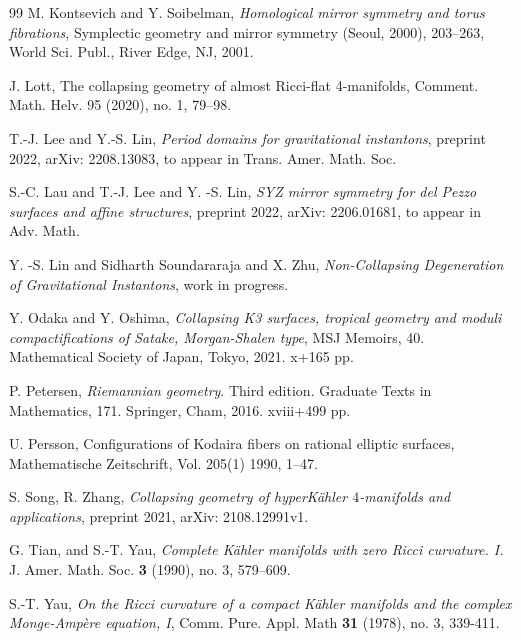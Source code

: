 \documentclass[11pt]{amsart}
\theoremstyle{plain}
\theoremstyle{definition}
\numberwithin{equation}{section}
\begin{document}
\begin{thebibliography}{99}
	 M. Kontsevich and Y. Soibelman, {\em Homological mirror symmetry and torus fibrations}, Symplectic geometry and mirror symmetry (Seoul, 2000), 203–263, World Sci. Publ., River Edge, NJ, 2001. 
	
	 J. Lott, The collapsing geometry of almost Ricci-flat 4-manifolds, Comment. Math. Helv. 95 (2020), no. 1, 79–98.
	
	 T.-J. Lee and Y.-S. Lin, {\em Period domains for gravitational instantons}, preprint 2022, arXiv: 2208.13083, to appear in Trans. Amer. Math. Soc.
	
	 S.-C. Lau and T.-J. Lee and Y. -S. Lin, {\em SYZ mirror symmetry for del Pezzo surfaces and affine structures}, preprint 2022, arXiv: 2206.01681, to appear in Adv. Math. 
	 
	
	 Y. -S. Lin and Sidharth Soundararaja and X. Zhu, {\em Non-Collapsing Degeneration of Gravitational Instantons}, work in progress. 
	
	 Y. Odaka and Y. Oshima, {\em 
	Collapsing K3 surfaces, tropical geometry and moduli compactifications of Satake, Morgan-Shalen type}, 
	MSJ Memoirs, 40. Mathematical Society of Japan, Tokyo, 2021. x+165 pp.
	
	 P. Petersen, {\em 
	Riemannian geometry}.
	Third edition. Graduate Texts in Mathematics, 171. Springer, Cham, 2016. xviii+499 pp. 
	
	 U. Persson, Configurations of Kodaira fibers on rational elliptic surfaces,
	Mathematische Zeitschrift, Vol. 205(1) 1990, 1–47.
	
	
	 S. Song, R. Zhang, {\em Collapsing geometry of hyperK\"ahler $4$-manifolds and applications}, preprint 2021, arXiv: 2108.12991v1. 
	
	
	
	 G. Tian, and S.-T. Yau, {\em Complete K\"ahler manifolds with zero Ricci curvature. I.} J. Amer. Math. Soc. {\bf 3} (1990), no. 3, 579--609.
	
	
	 S.-T. Yau, {\em On the Ricci curvature of a compact K\"ahler manifolds and the complex Monge-Amp\`ere equation, I}, Comm. Pure. Appl. Math {\bf 31} (1978), no. 3, 339-411.
	
	
\end{thebibliography} 	
\end{document}

